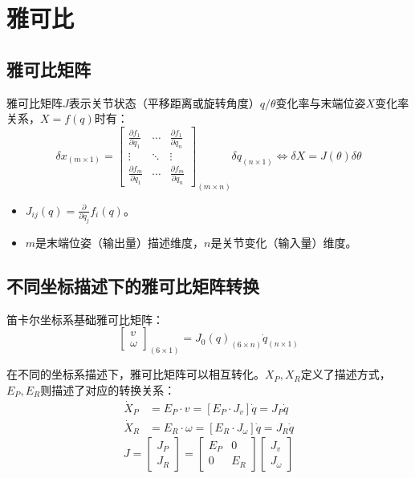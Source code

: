 \documentclass[
12pt, %
a4paper, 
oneside, %
headinclude,footinclude, %
]{scrartcl}
\begin{document}
\section{雅可比}
\subsection[雅可比矩阵]{雅可比矩阵}
雅可比矩阵$ J $表示关节状态（平移距离或旋转角度）$ q/\theta $变化率与末端位姿$ X $变化率关系，$ X = f(q) $时有：
$$
\delta x_{(m \times 1)} = 
\begin{bmatrix}
\frac{\partial f_1}{\partial q_1} & \cdots & \frac{\partial f_1}{\partial q_n} \\
\vdots & \ddots & \vdots \\
\frac{\partial f_m}{\partial q_1} & \cdots & \frac{\partial f_m}{\partial q_n}
\end{bmatrix}_{(m \times n)}
\delta q_{(n \times 1)}
\Leftrightarrow 
\delta X = J(\theta)\delta \theta
$$
\begin{itemize}
\item $ J_{ij}(q) = \frac{\partial}{\partial q_j} f_i(q) $。
\item $ m $是末端位姿（输出量）描述维度，$ n $是关节变化（输入量）维度。
\end{itemize} 
\subsection[不同坐标描述下的雅可比矩阵转换]{不同坐标描述下的雅可比矩阵转换}
笛卡尔坐标系基础雅可比矩阵：
$$ \begin{bmatrix} v \\ \omega \end{bmatrix}_{(6 \times 1)} = J_0(q)_{(6 \times n)} \dot{q}_{(n \times 1)} $$

在不同的坐标系描述下，雅可比矩阵可以相互转化。$ X_P,X_R $定义了描述方式，$ E_P,E_R $则描述了对应的转换关系：
\begin{align*}
\dot{X}_P &= E_P \cdot v = [E_P \cdot J_v] \dot{q} = J_P \dot{q} \\
\dot{X}_R &= E_R \cdot \omega = [E_R \cdot J_\omega] \dot{q} = J_R \dot{q}
\end{align*}
$$ J = \begin{bmatrix} J_P \\ J_R \end{bmatrix} = \begin{bmatrix} E_P & 0 \\ 0 & E_R \end{bmatrix} \begin{bmatrix} J_v \\ J_\omega \end{bmatrix} $$
\end{document}
